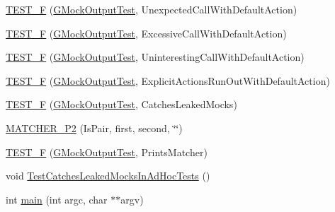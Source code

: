 \begin{DoxyCompactItemize}
\item 
\mbox{\hyperlink{_obj__test_2lib_2googletest-master_2googlemock_2test_2gmock__output__test___8cc_a4ac1ba04aede81f6771240e1c719a28e}{T\+E\+S\+T\+\_\+F}} (\mbox{\hyperlink{class_g_mock_output_test}{G\+Mock\+Output\+Test}}, Unexpected\+Call\+With\+Default\+Action)
\item 
\mbox{\hyperlink{_obj__test_2lib_2googletest-master_2googlemock_2test_2gmock__output__test___8cc_a521e2dc9f8197c96e992901a5e39f5cd}{T\+E\+S\+T\+\_\+F}} (\mbox{\hyperlink{class_g_mock_output_test}{G\+Mock\+Output\+Test}}, Excessive\+Call\+With\+Default\+Action)
\item 
\mbox{\hyperlink{_obj__test_2lib_2googletest-master_2googlemock_2test_2gmock__output__test___8cc_afcf833faaa33197a2f9815425f101d8c}{T\+E\+S\+T\+\_\+F}} (\mbox{\hyperlink{class_g_mock_output_test}{G\+Mock\+Output\+Test}}, Uninteresting\+Call\+With\+Default\+Action)
\item 
\mbox{\hyperlink{_obj__test_2lib_2googletest-master_2googlemock_2test_2gmock__output__test___8cc_a885556bf2f15e4a3d2eddac44dd7fc2b}{T\+E\+S\+T\+\_\+F}} (\mbox{\hyperlink{class_g_mock_output_test}{G\+Mock\+Output\+Test}}, Explicit\+Actions\+Run\+Out\+With\+Default\+Action)
\item 
\mbox{\hyperlink{_obj__test_2lib_2googletest-master_2googlemock_2test_2gmock__output__test___8cc_add20a01035182eac6e1278d06e001d04}{T\+E\+S\+T\+\_\+F}} (\mbox{\hyperlink{class_g_mock_output_test}{G\+Mock\+Output\+Test}}, Catches\+Leaked\+Mocks)
\item 
\mbox{\hyperlink{_obj__test_2lib_2googletest-master_2googlemock_2test_2gmock__output__test___8cc_ad6a4a921b72d12237933afe1de0c5c51}{M\+A\+T\+C\+H\+E\+R\+\_\+\+P2}} (Is\+Pair, first, second, \char`\"{}\char`\"{})
\item 
\mbox{\hyperlink{_obj__test_2lib_2googletest-master_2googlemock_2test_2gmock__output__test___8cc_a696afa4fa45b0e98ec9db1fe445fa679}{T\+E\+S\+T\+\_\+F}} (\mbox{\hyperlink{class_g_mock_output_test}{G\+Mock\+Output\+Test}}, Prints\+Matcher)
\item 
void \mbox{\hyperlink{_obj__test_2lib_2googletest-master_2googlemock_2test_2gmock__output__test___8cc_af634a5c16bccc1861e3fab3181bad4a0}{Test\+Catches\+Leaked\+Mocks\+In\+Ad\+Hoc\+Tests}} ()
\item 
int \mbox{\hyperlink{_obj__test_2lib_2googletest-master_2googlemock_2test_2gmock__output__test___8cc_a3c04138a5bfe5d72780bb7e82a18e627}{main}} (int argc, char $\ast$$\ast$argv)
\end{DoxyCompactItemize}


